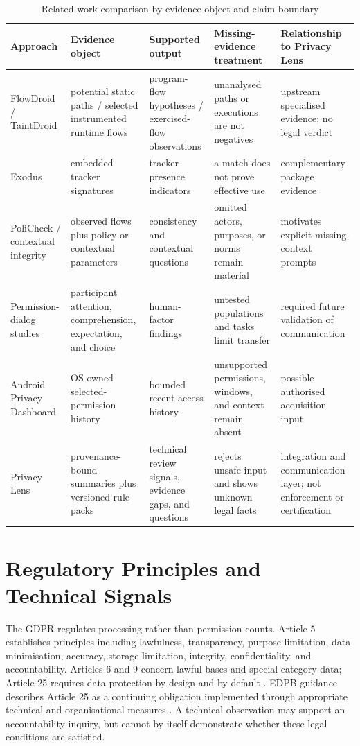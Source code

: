 \begin{table}[H]
\centering
\scriptsize
\caption{Related-work comparison by evidence object and claim boundary}
\label{tab:related-work-comparison}
\begin{tabular}{>{\raggedright\arraybackslash}p{}>{\raggedright\arraybackslash}p{}>{\raggedright\arraybackslash}p{}>{\raggedright\arraybackslash}p{}>{\raggedright\arraybackslash}p{}}
\toprule
Approach & Evidence object & Supported output & Missing-evidence treatment & Relationship to Privacy Lens \\
\midrule
FlowDroid / TaintDroid & potential static paths / selected instrumented runtime flows & program-flow hypotheses / exercised-flow observations & unanalysed paths or executions are not negatives & upstream specialised evidence; no legal verdict \\
Exodus & embedded tracker signatures & tracker-presence indicators & a match does not prove effective use & complementary package evidence \\
PoliCheck / contextual integrity & observed flows plus policy or contextual parameters & consistency and contextual questions & omitted actors, purposes, or norms remain material & motivates explicit missing-context prompts \\
Permission-dialog studies & participant attention, comprehension, expectation, and choice & human-factor findings & untested populations and tasks limit transfer & required future validation of communication \\
Android Privacy Dashboard & OS-owned selected-permission history & bounded recent access history & unsupported permissions, windows, and context remain absent & possible authorised acquisition input \\
Privacy Lens & provenance-bound summaries plus versioned rule packs & technical review signals, evidence gaps, and questions & rejects unsafe input and shows unknown legal facts & integration and communication layer; not enforcement or certification \\
\bottomrule
\end{tabular}
\end{table}

\section{Regulatory Principles and Technical Signals}

The GDPR regulates processing rather than permission counts. Article 5 establishes principles including lawfulness, transparency, purpose limitation, data minimisation, accuracy, storage limitation, integrity, confidentiality, and accountability. Articles 6 and 9 concern lawful bases and special-category data; Article 25 requires data protection by design and by default \cite{gdpr2016}. EDPB guidance describes Article 25 as a continuing obligation implemented through appropriate technical and organisational measures \cite{edpbArticle25}. A technical observation may support an accountability inquiry, but cannot by itself demonstrate whether these legal conditions are satisfied.

